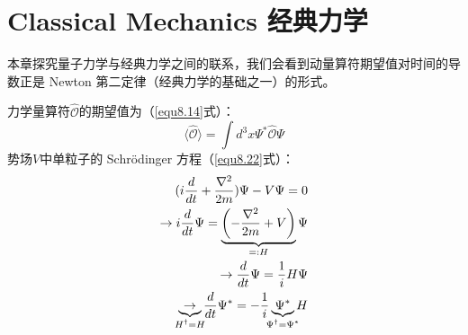 






\chapter[经典力学]{Classical Mechanics \quad 经典力学}
\label{chap10}
本章探究量子力学与经典力学之间的联系，我们会看到动量算符期望值对时间的导数正是 Newton 第二定律（经典力学的基础之一）的形式。

力学量算符$\hat{\mathcal{O}}$的期望值为（\ref{equ8.14}式）：
\[
    \langle \hat{\mathcal{O}} \rangle = \int d^3 x \Psi^* \hat{\mathcal{O}} \Psi
\]
势场$V$中单粒子的 Schr\"{o}dinger 方程（\ref{equ8.22}式）：
\[
\begin{split}
    (i \frac{d}{dt} + \frac{\nabla^2}{2m}) \Psi - V \Psi = 0 \\
    \to i \frac{d}{dt} \Psi = \underbrace{ \left( -\frac{\nabla^2}{2m} + V \right) }_{=: H} \Psi \\
    \to \frac{d}{dt} \Psi = \frac{1}{i} H \Psi \\
    \underbrace{ \to }_{\mathclap{H^\dag = H}} \frac{d}{dt} \Psi^* = - \frac{1}{i} \underbrace{\Psi^*}_{\mathclap{\Psi^\dag = \Psi^*}} H
\end{split}
\]

